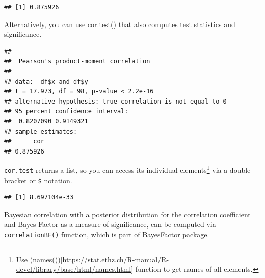 \documentclass[
]{book}
\newenvironment{Shaded}{\begin{snugshade}}{\end{snugshade}}
\newcommand{\AttributeTok}[1]{\textcolor[rgb]{0.77,0.63,0.00}{#1}}
\newcommand{\FunctionTok}[1]{\textcolor[rgb]{0.00,0.00,0.00}{#1}}
\newcommand{\NormalTok}[1]{#1}
\newcommand{\OtherTok}[1]{\textcolor[rgb]{0.56,0.35,0.01}{#1}}
\newcommand{\SpecialCharTok}[1]{\textcolor[rgb]{0.00,0.00,0.00}{#1}}
\newcommand{\StringTok}[1]{\textcolor[rgb]{0.31,0.60,0.02}{#1}}
\begin{document}
\begin{verbatim}
## [1] 0.875926
\end{verbatim}

Alternatively, you can use \href{https://stat.ethz.ch/R-manual/R-devel/library/stats/html/cor.test.html}{cor.test()} that also computes test statistics and significance.

\begin{Shaded}
\end{Shaded}

\begin{verbatim}
## 
##  Pearson's product-moment correlation
## 
## data:  df$x and df$y
## t = 17.973, df = 98, p-value < 2.2e-16
## alternative hypothesis: true correlation is not equal to 0
## 95 percent confidence interval:
##  0.8207090 0.9149321
## sample estimates:
##      cor 
## 0.875926
\end{verbatim}

\texttt{cor.test} returns a list, so you can access its individual elements\footnote{Use (names()){[}\url{https://stat.ethz.ch/R-manual/R-devel/library/base/html/names.html}{]} function to get names of all elements.} via a double-bracket or \texttt{\$} notation.

\begin{Shaded}
\end{Shaded}

\begin{verbatim}
## [1] 8.697104e-33
\end{verbatim}

Bayesian correlation with a posterior distribution for the correlation coefficient and Bayes Factor as a measure of significance, can be computed via \texttt{correlationBF()} function, which is part of \href{https://richarddmorey.github.io/BayesFactor}{BayesFactor} package.

\begin{Shaded}
\end{Shaded}
\end{document}
